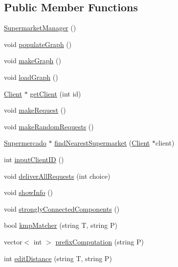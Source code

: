 \subsection*{Public Member Functions}
\begin{DoxyCompactItemize}
\item 
\hyperlink{class_supermarket_manager_a32727a0b65ce19d2dddf66d586b0fa57}{Supermarket\+Manager} ()
\item 
void \hyperlink{class_supermarket_manager_a882d9161a59b259f5b0f62c230c11db9}{populate\+Graph} ()
\item 
void \hyperlink{class_supermarket_manager_abab275f63e6169a76efd92c90aaac0b4}{make\+Graph} ()
\item 
void \hyperlink{class_supermarket_manager_a0072988df7db4459fe0a409894af51a4}{load\+Graph} ()
\item 
\hyperlink{class_client}{Client} $\ast$ \hyperlink{class_supermarket_manager_a15c50e904600847775367ff4f626f62d}{get\+Client} (int id)
\item 
void \hyperlink{class_supermarket_manager_a19901c8d338b7579398373aeda62ecf2}{make\+Request} ()
\item 
void \hyperlink{class_supermarket_manager_a6dbf83eef3433341c7a971860e3b8915}{make\+Random\+Requests} ()
\item 
\hyperlink{class_supermercado}{Supermercado} $\ast$ \hyperlink{class_supermarket_manager_a3869489967f0a60d1b9c36a85b05998b}{find\+Nearest\+Supermarket} (\hyperlink{class_client}{Client} $\ast$client)
\item 
int \hyperlink{class_supermarket_manager_a45ed55914bea37bcf0d5757d1ce027c4}{input\+Client\+ID} ()
\item 
void \hyperlink{class_supermarket_manager_a034d77cc6da77516f6dbb4d6c3c0513d}{deliver\+All\+Requests} (int choice)
\item 
void \hyperlink{class_supermarket_manager_a3bbfc2db4c66bbaab3a5536c7205a818}{show\+Info} ()
\item 
void \hyperlink{class_supermarket_manager_a325c08bab73c6ddfe61dbb600c8d55fd}{strongly\+Connected\+Components} ()
\item 
bool \hyperlink{class_supermarket_manager_a6a688cb8cec4cc323cf4e53e04068c2c}{kmp\+Matcher} (string T, string P)
\item 
vector$<$ int $>$ \hyperlink{class_supermarket_manager_a3f18b0466fcb9369084ecd0c4e2d2e4a}{prefix\+Computation} (string P)
\item 
int \hyperlink{class_supermarket_manager_a16c8f9e3da09e91cb50d0ae932bb4eb2}{edit\+Distance} (string T, string P)

\end{DoxyCompactItemize}

